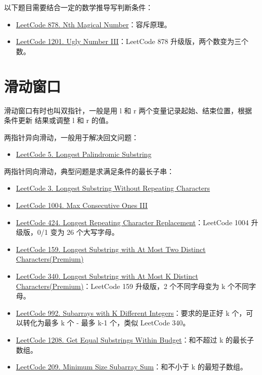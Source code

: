 以下题目需要结合一定的数学推导写判断条件：

\begin{itemize}
  \label{lc:bs-range-math}
  \item
    \href{https://leetcode.com/problems/nth-magical-number/}{LeetCode 878. Nth
      Magical Number}：容斥原理。
  \item
    \href{https://leetcode.com/problems/ugly-number-iii/}{LeetCode 1201. Ugly
      Number III}：LeetCode 878 升级版，两个数变为三个数。

\end{itemize}

\section{滑动窗口}

滑动窗口有时也叫双指针，一般是用 l 和 r 两个变量记录起始、结束位置，根据条件更新
结果或调整 l 和 r 的值。

两指针异向滑动，一般用于解决回文问题：
\begin{itemize}
  \item
    \href{https://leetcode.com/problems/longest-palindromic-substring/}{LeetCode
    5. Longest Palindromic Substring}
\end{itemize}

两指针同向滑动，典型问题是求满足条件的最长子串：
\begin{itemize}
  \item
    \href{https://leetcode.com/problems/longest-substring-without-repeating-characters/submissions/}{LeetCode
      3. Longest Substring Without Repeating Characters}
  \item
    \href{https://leetcode.com/problems/max-consecutive-ones-iii/}{LeetCode 1004. Max Consecutive Ones III}
  \item
    \href{https://leetcode.com/problems/longest-repeating-character-replacement/}{LeetCode
      424. Longest Repeating Character Replacement}：LeetCode 1004 升级版，0/1 变为 26 个大写字母。
  \item
    \href{https://leetcode.com/problems/longest-substring-with-at-most-two-distinct-characters}{LeetCode
      159. Longest Substring with At Most Two Distinct Characters(Premium)}
  \item
    \href{https://leetcode.com/problems/longest-substring-with-at-most-k-distinct-characters}{LeetCode
      340. Longest Substring with At Most K Distinct Characters(Premium)}：LeetCode 159
    升级版，2 个不同字母变为 k 个不同字母。
  \item
    \href{https://leetcode.com/problems/subarrays-with-k-different-integers}{LeetCode
    992. Subarrays with K Different Integers}：要求的是正好 k 个，可以转化为最多
  k 个 - 最多 k-1 个，类似 LeetCode 340。
  \item
    \href{https://leetcode.com/problems/get-equal-substrings-within-budget/}{LeetCode
      1208. Get Equal Substrings Within Budget}：和不超过 k 的最长子数组。
  \item
    \href{https://leetcode.com/problems/minimum-size-subarray-sum/}{LeetCode
      209. Minimum Size Subarray Sum}：和不小于 k 的最短子数组。
\end{itemize}

